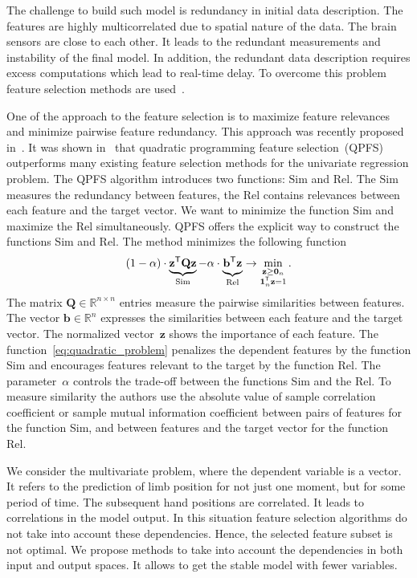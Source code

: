 \documentclass[12pt,twoside]{article}
\theoremstyle{definition}
\newcommand{\bz}{\mathbf{z}}
\newcommand{\bb}{\mathbf{b}}
\newcommand{\bQ}{\mathbf{Q}}
\newcommand{\bbR}{\mathbb{R}}
\newcommand{\T}{\mathsf{T}}
\newcommand{\bOne}{\boldsymbol{1}}
\newcommand{\bZero}{\boldsymbol{0}}
\begin{document}
The challenge to build such model is redundancy in initial data description. 
The features are highly multicorrelated due to spatial nature of the data. 
The brain sensors are close to each other. 
It leads to the redundant measurements and instability of the final model.
In addition, the redundant data description requires excess computations which lead to real-time delay. 
To overcome this problem feature selection methods are used~\cite{katrutsa2015stress,li2017feature}.

One of the approach to the feature selection is to maximize feature relevances and minimize pairwise feature redundancy. 
This approach was recently proposed in~\cite{ding2005minimum}.
It was shown in~\cite{rodriguez2010quadratic,katrutsa2017comprehensive} that quadratic programming feature selection~(QPFS) outperforms many existing feature selection methods for the univariate regression problem. 
The QPFS algorithm introduces two functions: $\text{Sim}$ and $\text{Rel}$.
The $\text{Sim}$ measures the redundancy between features, the $\text{Rel}$ contains relevances between each feature and the target vector.
We want to minimize the function Sim and maximize the Rel simultaneously.
QPFS offers the explicit way to construct the functions Sim and Rel.
The method minimizes the following function
\begin{equation}
(1 - \alpha) \cdot \underbrace{\bz^{\T} \bQ \bz}_{\text{Sim}} - \alpha \cdot \underbrace{\vphantom{()} \bb^{\T} \bz}_{\text{Rel}} \rightarrow \min_{\substack{\bz \geq \bZero_n \\ \bOne_n^{\T} \bz=1}}.
\label{eq:quadratic_problem}
\end{equation}
The matrix $\bQ \in \bbR^{n \times n}$ entries measure the pairwise similarities between features.
The vector $\bb \in \bbR^n$ expresses the similarities between each feature and the target vector.
The normalized vector~$\bz$ shows the importance of each feature.
The function~\eqref{eq:quadratic_problem} penalizes the dependent features by the function Sim and encourages features relevant to the target by the function Rel.
The parameter~$\alpha$ controls the trade-off between the functions Sim and the Rel.
To measure similarity the authors use the absolute value of sample correlation coefficient or sample mutual information coefficient between pairs of features for the function Sim, and between features and the target vector for the function Rel.

We consider the multivariate problem, where the dependent variable is a vector. 
It refers to the prediction of limb position for not just one moment, but for some period of time. 
The subsequent hand positions are correlated. 
It leads to correlations in the model output. 
In this situation feature selection algorithms do not take into account these dependencies.
Hence, the selected feature subset is not optimal.
We propose methods to take into account the dependencies in both input and output spaces. 
It allows to get the stable model with fewer variables.
\end{document}
